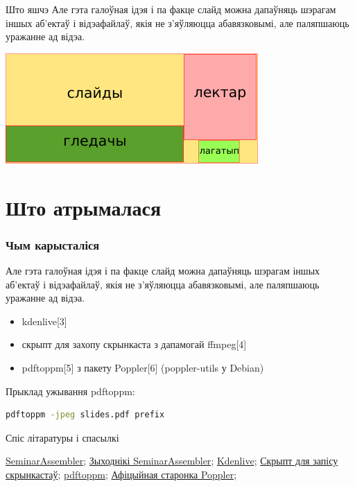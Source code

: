 \documentclass[ignorenonframetext,hyperref={pdftex,unicode}]{beamer}
\begin{document}
\begin{frame}{Што яшчэ} 
	Але гэта галоўная ідэя і па факце слайд можна дапаўняць шэрагам іншых аб'ектаў і відэафайлаў, якія не з'яўляюцца абавязковымі, але паляпшаюць уражанне ад відэа.
	\begin{center}
 		\includegraphics[height=0.5\textheight,keepaspectratio]{3}		
	\end{center}
\end{frame}

\section{Што атрымалася}

\begin{frame}[fragile]
	\frametitle{Чым карысталіся} 
	Але гэта галоўная ідэя і па факце слайд можна дапаўняць шэрагам іншых аб'ектаў і відэафайлаў, якія не з'яўляюцца абавязковымі, але паляпшаюць уражанне ад відэа.
	\begin{itemize}
		\item kdenlive[3]
		\item скрыпт для захопу скрынкаста з дапамогай ffmpeg[4]
		\item pdftoppm[5] з пакету Poppler[6] (poppler-utils у Debian)
	\end{itemize}
	
	Прыклад ужывання pdftoppm:
		\begin{lstlisting}[language=bash]
pdftoppm -jpeg slides.pdf prefix
		\end{lstlisting}
\end{frame}

\frame{\questionslide}

\begin{frame}{Спіс літаратуры і спасылкі}
	\begin{thebibliography}{10}
	\beamertemplatetextbibitems
	\bibitem{}
		{\sc \href{http://wiki.4intra.net/SeminarAssembler}{SeminarAssembler}};
	\bibitem{}
		{\sc \href{https://abf.io/belonesox/seminar-assembler/}{Зыходнікі SeminarAssembler}};
	\bibitem{}
		{\sc \href{https://kdenlive.org/}{Kdenlive}};
	\bibitem{}
		{\sc \href{https://github.com/measles/mlug\_screencast\_sound}{Скрыпт для запісу скрынкастаў}};
	\bibitem{}
		{\sc \href{http://linux.die.net/man/1/pdftoppm}{pdftoppm}};
	\bibitem{}
		{\sc \href{https://poppler.freedesktop.org/}{Афіцыйная старонка Poppler}};
	\end{thebibliography}
\end{frame}
\end{document}
